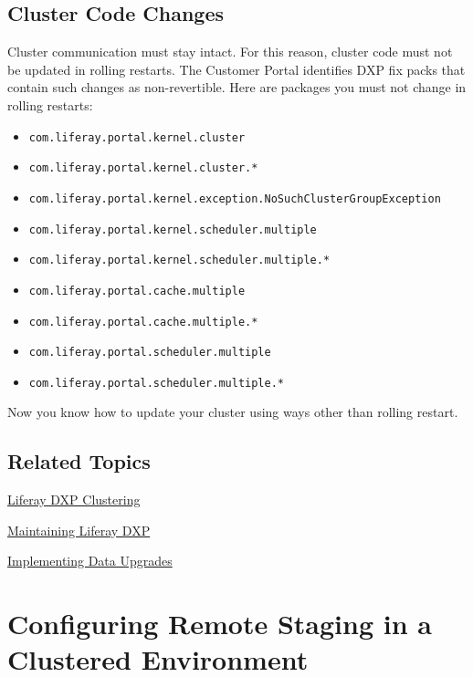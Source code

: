 \subsection{Cluster Code Changes}\label{cluster-code-changes}

Cluster communication must stay intact. For this reason, cluster code
must not be updated in rolling restarts. The Customer Portal identifies
DXP fix packs that contain such changes as non-revertible. Here are
packages you must not change in rolling restarts:

\begin{itemize}
\tightlist
\item
  \texttt{com.liferay.portal.kernel.cluster}
\item
  \texttt{com.liferay.portal.kernel.cluster.*}
\item
  \texttt{com.liferay.portal.kernel.exception.NoSuchClusterGroupException}
\item
  \texttt{com.liferay.portal.kernel.scheduler.multiple}
\item
  \texttt{com.liferay.portal.kernel.scheduler.multiple.*}
\item
  \texttt{com.liferay.portal.cache.multiple}
\item
  \texttt{com.liferay.portal.cache.multiple.*}
\item
  \texttt{com.liferay.portal.scheduler.multiple}
\item
  \texttt{com.liferay.portal.scheduler.multiple.*}
\end{itemize}

Now you know how to update your cluster using ways other than rolling
restart.

\subsection{Related Topics}\label{related-topics-2}

\href{/docs/7-0/deploy/-/knowledge_base/d/liferay-clustering}{Liferay
DXP Clustering}

\href{/docs/7-0/deploy/-/knowledge_base/d/maintaining-liferay}{Maintaining
Liferay DXP}

\href{/docs/7-0/tutorials/-/knowledge_base/t/data-upgrades-and-verifiers}{Implementing
Data Upgrades}

\section{Configuring Remote Staging in a Clustered
Environment}\label{configuring-remote-staging-in-a-clustered-environment}

